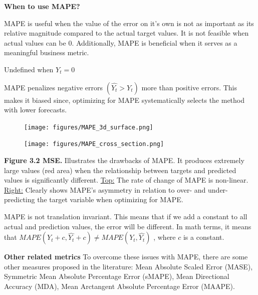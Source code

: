 \textbf{When to use MAPE?}

MAPE is useful when the value of the error on it's own is not as important as its relative magnitude compared to the actual target values.
It is not feasible when actual values can be 0. Additionally, MAPE is beneficial when it serves as a meaningful business metric.

{
    \item Undefined when $Y_{t} = 0$
    \item MAPE penalizes negative errors $(\hat{Y_{t}} > Y_{t})$ more than positive errors. This makes it biased since, optimizing for MAPE systematically selects the method with lower forecasts.
}

\clearpage

\thispagestyle{customstyle}

\begin{figure}[ht!]
    \centering
    \texttt{[image: figures/MAPE\_3d\_surface.png]}
\end{figure}

\begin{figure}
    \centering
    \vspace{-10pt} %
    \texttt{[image: figures/MAPE\_cross\_section.png]} %
    \vspace{-10pt} %
\end{figure}


\textbf{Figure 3.2 MSE.} Illustrates the drawbacks of MAPE. It produces extremely large values (red area) when the relationship between
targets and predicted values is significantly different. \underline{Top:} The rate of change of MAPE is non-linear.
\underline{Right:} Clearly shows MAPE's asymmetry in relation to over- and under-predicting the target variable when optimizing for MAPE.

{MAPE is not translation invariant. This means that if we add a constant to all actual and prediction values, the error will be different.
In math terms, it means that $MAPE(Y_{t} + c, \hat{Y_{t}} + c) \not= MAPE(Y_{t}, \hat{Y_{t}})$ , where $c$ is a constant.}


\textbf{Other related metrics}
To overcome these issues with MAPE, there are some other measures proposed in the literature: Mean Absolute Scaled Error (MASE),
Symmetric Mean Absolute Percentage Error (sMAPE), Mean Directional Accuracy (MDA), Mean Arctangent Absolute Percentage Error (MAAPE).

